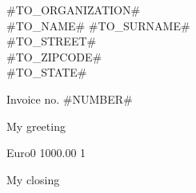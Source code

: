 \documentclass{letter}
\date{#DATE#}
\begin{document}
  \begin{letter}{#TO_ORGANIZATION# \\ #TO_NAME# #TO_SURNAME# \\ #TO_STREET# \\ #TO_ZIPCODE# \\ #TO_STATE#}
    \opening{Invoice no. #NUMBER#}
    My greeting
    \begin{invoice}{Euro}{0}
       {1000.00} {1}
    \end{invoice}
    \closing{My closing}
  \end{letter}
\end{document}

